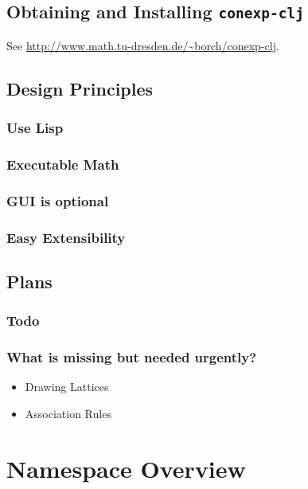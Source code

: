 \documentclass{scrbook}
\newcommand{\conexpclj}{\texttt{conexp-clj}}
\theoremstyle{plain}
\theoremstyle{plain}
\theoremstyle{plain}
\theoremstyle{nonumberplain}
\begin{document}
\section{Obtaining and Installing \conexpclj}

See \url{http://www.math.tu-dresden.de/~borch/conexp-clj}.


\section{Design Principles}

\subsection{Use Lisp}

\subsection{Executable Math}

\subsection{GUI is optional}

\subsection{Easy Extensibility}


\section{Plans}

\subsection{Todo}

\subsection{What is missing but needed urgently?}

\begin{itemize}
\item Drawing Lattices
\item Association Rules
\end{itemize}


\chapter{Namespace Overview}
\end{document}
